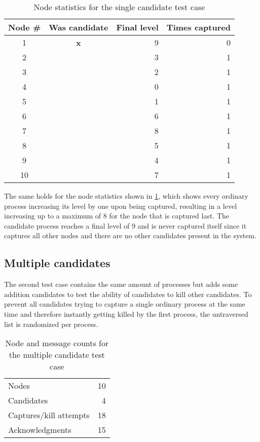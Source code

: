 \documentclass{article}
\begin{document}
\begin{table}[H]
	\centering
	\caption{Node statistics for the single candidate test case}
	\begin{tabular}{c c r r}
		\toprule
		Node \#	& Was candidate	& Final level 	& Times captured	\\
		\midrule
		1		& \textbf{x}	& 9				& 0					\\
		2		& 				& 3				& 1					\\
		3		& 				& 2				& 1					\\
		4		& 				& 0				& 1					\\
		5		& 				& 1				& 1					\\
		6		& 				& 6				& 1					\\
		7		& 				& 8				& 1					\\
		8		& 				& 5				& 1					\\
		9		& 				& 4				& 1					\\
		10		& 				& 7				& 1					\\
		\bottomrule
	\end{tabular}
	\label{tab:stats-single}
\end{table}

The same holds for the node statistics shown in \cref{tab:stats-single}, which shows every ordinary process increasing its level by one upon being captured, resulting in a level increasing up to a maximum of 8 for the node that is captured last. The candidate process reaches a final level of 9 and is never captured itself since it captures all other nodes and there are no other candidates present in the system.

\subsection{Multiple candidates}
The second test case contains the same amount of processes but adds some addition candidates to test the ability of candidates to kill other candidates. To prevent all candidates trying to capture a single ordinary process at the same time and therefore instantly getting killed by the first process, the untraversed list is randomized per process.

\begin{table}[H]
	\centering
	\caption{Node and message counts for the multiple candidate test case}
	\begin{tabular}{l r}
		\toprule
		Nodes 					& 10	\\
		Candidates 				& 4 	\\
		Captures/kill attempts 	& 18	\\
		Acknowledgments 		& 15	\\
		\bottomrule
	\end{tabular}
	\label{tab:counts-multiple}
\end{table}
\end{document}
